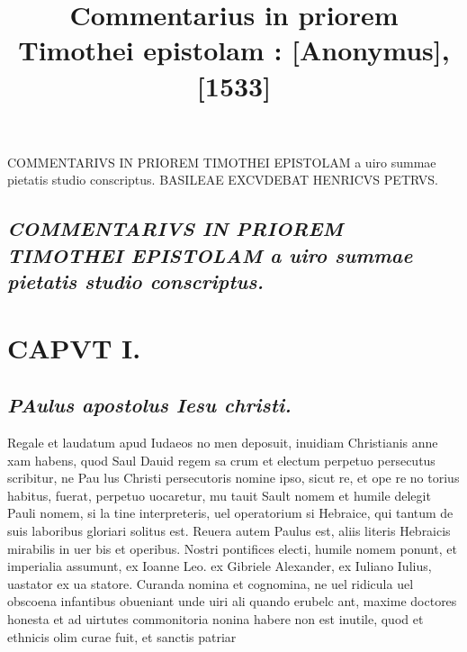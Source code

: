\documentclass{article}
\begin{document}
\date{}
        \title{Commentarius in priorem Timothei epistolam : [Anonymus], [1533]}
\maketitle
\tableofcontents
\clearpage
\begin{pages} 
\beginnumbering
        \pstart COMMENTARIVS IN PRIOREM TIMOTHEI EPISTOLAM a uiro summae pietatis studio conscriptus.  \pend\pstart BASILEAE EXCVDEBAT HENRICVS PETRVS.  \pend
\marginpar{[ p.3 ]}
{}
\subsection*{\textit{COMMENTARIVS IN PRIOREM TIMOTHEI EPISTOLAM a uiro summae pietatis studio conscriptus. }}
\section{CAPVT I.}
{}
\subsection*{\textit{\huge\textbf{P}\normalsize Aulus apostolus Iesu christi. }}\pstart Regale et laudatum apud Iudaeos no men deposuit, inuidiam Christianis anne xam habens, quod Saul Dauid regem sa crum et electum perpetuo persecutus scribitur, ne Pau lus Christi persecutoris nomine ipso, sicut re, et ope re no torius habitus, fuerat, perpetuo uocaretur, mu tauit Sault nomem et humile delegit Pauli nomem, si la tine interpreteris, uel operatorium si Hebraice, qui tantum de suis laboribus gloriari solitus est. Reuera autem Paulus est, aliis literis Hebraicis mirabilis in uer bis et operibus. Nostri pontifices electi, humile nomem ponunt, et imperialia assumunt, ex Ioanne Leo. ex Gibriele Alexander, ex Iuliano Iulius, uastator ex ua statore. Curanda nomina et cognomina, ne uel ridicula uel obscoena infantibus obueniant unde uiri ali quando erubelc ant, maxime doctores honesta et ad uirtutes commonitoria nonina habere non est inutile, quod et ethnicis olim curae fuit, et sanctis patriar\pend

\end{pages}
\end{document}
